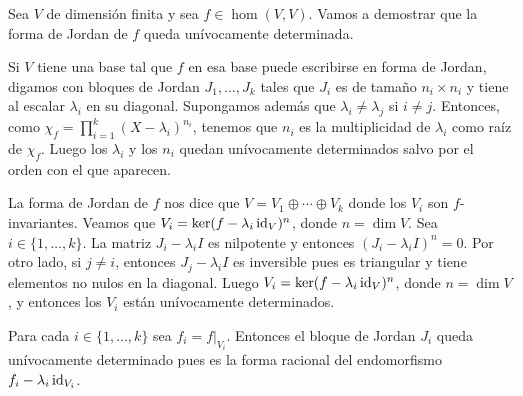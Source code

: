 \begin{block}
    Sea $V$ de dimensión finita y sea $f\in\hom(V,V)$. Vamos a demostrar que la
    forma de Jordan de $f$ queda unívocamente determinada. 
    
    Si $V$ tiene una base tal que $f$ en esa base puede escribirse en forma de
    Jordan, digamos con bloques de Jordan $J_1,\dots,J_k$ tales que $J_i$ es
    de tamaño $n_i\times n_i$ y tiene al escalar $\lambda_i$ en su diagonal.
    Supongamos además que $\lambda_i\ne\lambda_j$ si $i\ne j$. Entonces, como
    $\chi_f=\prod_{i=1}^k(X-\lambda_i)^{n_i}$, tenemos que $n_i$ es la
    multiplicidad de $\lambda_i$ como raíz de $\chi_f$. Luego los $\lambda_i$ y
    los $n_i$ quedan unívocamente determinados salvo por el orden con el que
    aparecen. 

    La forma de Jordan de $f$ nos dice que $V=V_1\oplus\cdots\oplus V_k$ donde
    los $V_i$ son $f$-invariantes. Veamos que $V_i=\ker (f-\lambda_i\operatorname{id}_V)^n$,
    donde $n=\dim V$. Sea $i\in\{1,\dots,k\}$. La matriz $J_i-\lambda_iI$ es
    nilpotente y entonces $(J_i-\lambda_iI)^n=0$. Por otro lado, si $j\ne i$,
    entonces $J_j-\lambda_iI$ es inversible pues es triangular y tiene
    elementos no nulos en la diagonal. Luego $V_i=\ker(f-\lambda_i\operatorname{id}_V)^n$,
    donde $n=\dim V$, y entonces los $V_i$ están unívocamente determinados.

    Para cada $i\in\{1,\dots,k\}$ sea $f_i=f|_{V_i}$. Entonces el bloque de
    Jordan $J_i$ queda unívocamente determinado pues es la forma racional del
    endomorfismo $f_i-\lambda_i\operatorname{id}_{V_i}$. 
\end{block}

